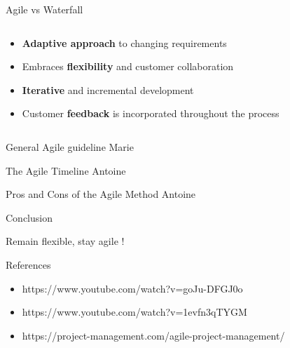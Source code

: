 \documentclass[10pt]{beamer}
\begin{document}
\begin{frame}{Agile vs Waterfall}
  \vspace{2cm}
  \begin{columns}[T]
    \begin{column}{0.5\textwidth}
      \begin{itemize}
        \item<2-> \textbf{Adaptive approach }to changing requirements
        \item<3-> Embraces \textbf{flexibility} and customer collaboration
        \item<4-> \textbf{Iterative} and incremental development
        \item<5-> Customer \textbf{feedback} is incorporated throughout the process
      \end{itemize}
    \end{column}

    \begin{column}{0.5\textwidth}
    \end{column}
  \end{columns}
\end{frame}

\begin{frame}{General Agile guideline}
    Marie
\end{frame}

\begin{frame}{The Agile Timeline}
    Antoine
\end{frame}

\begin{frame}{Pros and Cons of the Agile Method}
    Antoine
\end{frame}

\begin{frame}{Conclusion}

  Remain flexible, stay agile !
  
\end{frame}

\begin{frame}{References}
  \begin{itemize}
    \item https://www.youtube.com/watch?v=goJu-DFGJ0o
    \item https://www.youtube.com/watch?v=1evfn3qTYGM
    \item https://project-management.com/agile-project-management/
  \end{itemize}
\end{frame}
\end{document}
